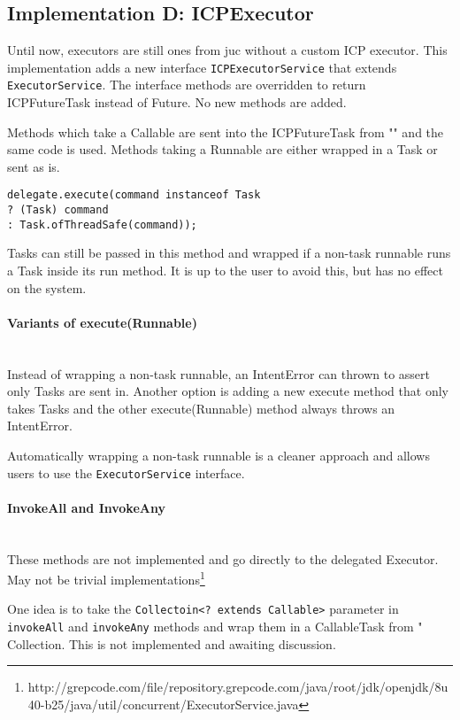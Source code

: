 \subsection{Implementation D: ICPExecutor}
Until now, executors are still ones from \gls{juc} without a custom ICP executor. This implementation adds
a new interface \lstinline{ICPExecutorService} that extends \lstinline{ExecutorService}. The interface methods
are overridden to return ICPFutureTask instead of Future. No new methods are added.

Methods which take a Callable are sent into the ICPFutureTask from "" and the same
code is used. Methods taking a Runnable are either wrapped in a Task or sent
as is.

\begin{lstlisting}[caption=execute(Runnable)]
delegate.execute(command instanceof Task
? (Task) command
: Task.ofThreadSafe(command));
\end{lstlisting}

Tasks can still be passed in this method and wrapped if a non-task runnable runs a Task inside its run method. It is
up to the user to avoid this, but has no effect on the system.

\paragraph*{Variants of execute(Runnable)} ~\\
Instead of wrapping a non-task runnable, an IntentError can thrown to assert only Tasks are sent in. Another
option is adding a new execute method that only takes Tasks and the other execute(Runnable) method always throws
an IntentError.

Automatically wrapping a non-task runnable is a cleaner approach and allows users to use the \lstinline{ExecutorService}
interface.

\paragraph*{InvokeAll and InvokeAny} ~\\
These methods are not implemented and go directly to the delegated Executor. May not be trivial
implementations\footnote{http://grepcode.com/file/repository.grepcode.com/java/root/jdk/openjdk/8u40-b25/java/util/concurrent/ExecutorService.java}

One idea is to take the \lstinline{Collectoin<? extends Callable>} parameter in \lstinline{invokeAll}
and \lstinline{invokeAny} methods and wrap them in a CallableTask from "
Collection. This is not implemented and awaiting discussion.

